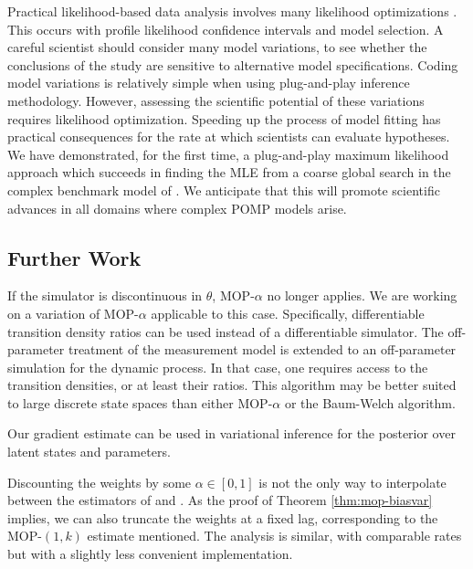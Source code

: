 \documentclass[numsec,webpdf,modern,medium,namedate]{oup-authoring-template}
\newcommand\arxiv[2]{#2} %
\theoremstyle{thmstyleone}%
\theoremstyle{thmstyletwo}%
\theoremstyle{thmstylethree}%
\begin{document}
Practical likelihood-based data analysis involves many likelihood optimizations \citep{king08,blake14,pons-salort18,subramanian21,fox22,drake23}.
This occurs with profile likelihood confidence intervals and model selection. A careful scientist should consider many model variations, to see whether the conclusions of the study are sensitive to alternative model specifications.
Coding model variations is relatively simple when using plug-and-play inference methodology.
However, assessing the scientific potential of these variations requires likelihood optimization.
Speeding up the process of model fitting has practical consequences for the rate at which scientists can evaluate hypotheses.
We have demonstrated, for the first time, a plug-and-play maximum likelihood approach which succeeds in finding the MLE from a coarse global search in the complex benchmark model of \cite{king08}.
We anticipate that this will promote scientific advances in all domains where complex POMP models arise.

\arxiv{}{\vspace*{-2mm}}
\subsection{Further Work}

If the simulator is discontinuous in $\theta$, MOP-$\alpha$ no longer applies.
We are working on a variation of MOP-$\alpha$ applicable to this case.
Specifically, differentiable transition density ratios can be used instead of a differentiable simulator.
The off-parameter treatment of the measurement model is extended to an off-parameter simulation for the dynamic process.
In that case, one requires access to the transition densities, or at least their ratios. 
This algorithm may be better suited to large discrete state spaces than either MOP-$\alpha$ or the Baum-Welch algorithm.

Our gradient estimate can be used in variational inference for the posterior over latent states \citep{naesseth18} and parameters. 

Discounting the weights by some $\alpha \in [0,1]$ is not the only way to interpolate between the estimators of \cite{naesseth18} and \cite{poyiadjis11}. 
As the proof of Theorem \ref{thm:mop-biasvar} implies, we can also truncate the weights at a fixed lag, corresponding to the MOP-$(1,k)$ estimate mentioned. 
The analysis is similar, with comparable rates but with a slightly less convenient implementation. 
\end{document}
